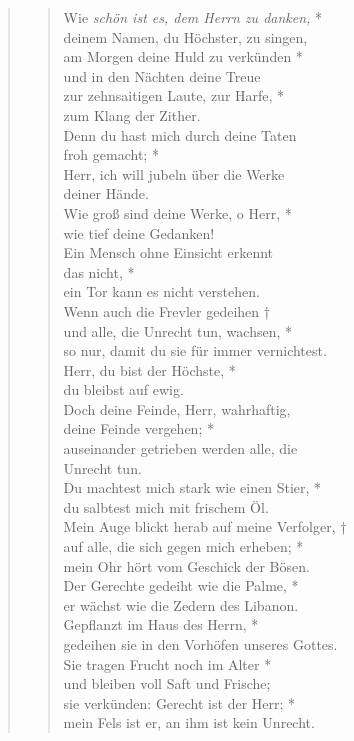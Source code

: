 \begin{quote}
\begin{verse}
Wie \textit{schön ist es, dem Herrn zu danken,} *\\
deinem Namen, du Höchster, zu singen, \\
\vin am Morgen deine Huld zu verkünden *\\
\vin und in den Nächten deine Treue\\
zur zehnsaitigen Laute, zur Harfe, *\\
zum Klang der Zither.\\
\vin Denn du hast mich durch deine Taten\\ \vin froh gemacht; *\\
\vin Herr, ich will jubeln über die Werke\\ deiner Hände.\\
Wie groß sind deine Werke, o Herr, *\\
wie tief deine Gedanken! \\
\vin Ein Mensch ohne Einsicht erkennt \\ \vin das nicht, *\\
\vin ein Tor kann es nicht verstehen. \\
Wenn auch die Frevler gedeihen †\\
und alle, die Unrecht tun, wachsen, *\\ so nur, damit du sie für immer vernichtest.\\
\vin Herr, du bist der Höchste, *\\
\vin du bleibst auf ewig.\\
Doch deine Feinde, Herr, wahrhaftig,\\ deine Feinde vergehen; *\\
auseinander getrieben werden alle, die\\ Unrecht tun. \\
\vin Du machtest mich stark wie einen Stier, *\\
\vin du salbtest mich mit frischem Öl.\\
Mein Auge blickt herab auf meine Verfolger, †\\
auf alle, die sich gegen mich erheben; *\\ mein Ohr hört vom Geschick der Bösen. \\
\vin Der Gerechte gedeiht wie die Palme, *\\
\vin er wächst wie die Zedern des Libanon. \\
Gepflanzt im Haus des Herrn, *\\
gedeihen sie in den Vorhöfen unseres Gottes. \\
\vin Sie tragen Frucht noch im Alter *\\
\vin und bleiben voll Saft und Frische;\\
sie verkünden: Gerecht ist der Herr; *\\
mein Fels ist er, an ihm ist kein Unrecht. \\

\end{verse}
\end{quote}


